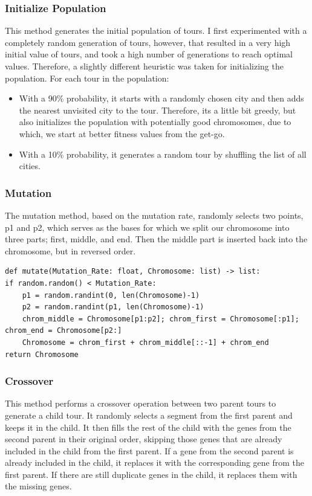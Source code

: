 \documentclass{article}
\theoremstyle{mytheoremstyle}
\theoremstyle{mytheoremstyle}
\theoremstyle{myproblemstyle}
\begin{document}
\subsubsection*{Initialize Population}
This method generates the initial population of tours. I first experimented with a completely random generation of tours, however, that resulted in a very high initial value of tours, and took a high number of generations to reach optimal values. Therefore, a slightly different heuristic was taken for initializing the population. For each tour in the population: \vspace*{-2mm}
\begin{itemize}
    \item With a 90\% probability, it starts with a randomly chosen city and then adds the nearest unvisited city to the tour. Therefore, its a little bit greedy, but also initializes the population with potentially good chromosomes, due to which, we start at better fitness values from the get-go. \vspace*{-2mm}
    \item With a 10\% probability, it generates a random tour by shuffling the list of all cities.
\end{itemize}

\subsubsection*{Mutation}
The mutation method, based on the mutation rate, randomly selects two points, p1 and p2, which serves as the bases for which we split our chromosome into three parts; first, middle, and end. Then the middle part is inserted back into the chromosome, but in reversed order.

\begin{lstlisting}[label=tsp_mutation, caption={Mutation Algorithm}]
def mutate(Mutation_Rate: float, Chromosome: list) -> list:
if random.random() < Mutation_Rate:
    p1 = random.randint(0, len(Chromosome)-1)
    p2 = random.randint(p1, len(Chromosome)-1)
    chrom_middle = Chromosome[p1:p2]; chrom_first = Chromosome[:p1]; chrom_end = Chromosome[p2:]
    Chromosome = chrom_first + chrom_middle[::-1] + chrom_end
return Chromosome
\end{lstlisting}

\subsubsection*{Crossover}
This method performs a crossover operation between two parent tours to generate a child tour. It randomly selects a segment from the first parent and keeps it in the child. It then fills the rest of the child with the genes from the second parent in their original order, skipping those genes that are already included in the child from the first parent. If a gene from the second parent is already included in the child, it replaces it with the corresponding gene from the first parent. If there are still duplicate genes in the child, it replaces them with the missing genes.
\end{document}
